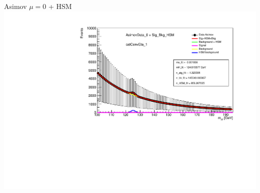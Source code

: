 \documentclass[10pt,UKenglish, leqno, xcolor = dvipsnames]{beamer}
\begin{document}
		\begin{frame}{Asimov $\mu=0$ + HSM}
			\vfill
			\centering
			\includegraphics[width=\textwidth]{../images/week_15/HSM_AsimovData_0_catConvEta_1.pdf}
			\vfill
		\end{frame}
	
\end{document}
